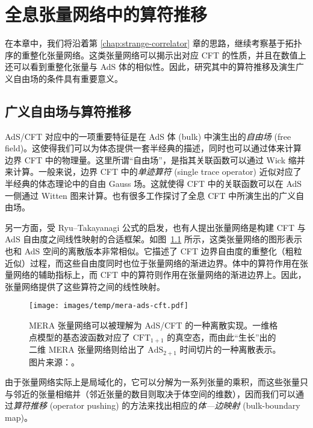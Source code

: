 \chapter{全息张量网络中的算符推移}
\label{chap:operator-pushing}

在本章中，我们将沿着第 \ref{chap:strange-correlator} 章的思路，继续考察基于拓扑序的重整化张量网络。这类张量网络可以揭示出对应 CFT 的性质，并且在数值上还可以看到重整化张量与 AdS 体的相似性。因此，研究其中的算符推移及演生广义自由场的条件具有重要意义。

\section{广义自由场与算符推移}

AdS/CFT 对应\cite{maldacena1999large}中的一项重要特征是在 AdS 体 (bulk) 中演生出的\emph{自由场} (free field)。这使得我们可以为体态提供一套半经典的描述，同时也可以通过体来计算边界 CFT 中的物理量。这里所谓“自由场”，是指其关联函数可以通过 Wick 缩并来计算。一般来说，边界 CFT 中的\emph{单迹算符} (single trace operator) 近似对应了半经典的体态理论中的自由 Gauss 场。这就使得 CFT 中的关联函数可以在 AdS 一侧通过 Witten 图来计算\cite{witten1998anti,gubser1998gauge}。也有很多工作探讨了全息 CFT 中所演生出的广义自由场\cite{dutsch2003generalized,liu2019dimensional,collier2019quantum,nebabu2023bulk}。

另一方面，受 Ryu--Takayanagi 公式\cite{ryu2006holographic}的启发，也有人提出张量网络是构建 CFT 与 AdS 自由度之间线性映射的合适框架\cite{swingle2012entanglement}。如图~\ref{fig:mera-ads-cft} 所示，这类张量网络的图形表示也和 AdS 空间的离散版本非常相似。它描述了 CFT 边界自由度的重整化（粗粒近似）过程，而这些自由度同时也位于张量网络的渐进边界。体中的算符作用在张量网络的辅助指标上，而 CFT 中的算符则作用在张量网络的渐进边界上。因此，张量网络提供了这些算符之间的线性映射\cite{pastawski2015holographic,hayden2016holographic}。

\begin{figure}[htb]
  \centering
  \texttt{[image: images/temp/mera-ads-cft.pdf]}
  \caption[MERA 张量网络与 AdS/CFT]{MERA 张量网络可以被理解为 AdS/CFT 的一种离散实现。一维格点模型的基态波函数对应了 $\text{CFT}_{1+1}$ 的真空态，而由此“生长”出的二维 MERA 张量网络则给出了 $\text{AdS}_{2+1}$ 时间切片的一种离散表示。图片来源：\parencite{evenbly2011tensor}。}
  \label{fig:mera-ads-cft}
\end{figure}

由于张量网络实际上是局域化的，它可以分解为一系列张量的乘积，而这些张量只与邻近的张量相缩并（邻近张量的数目则取决于体空间的维数），因而我们可以通过\emph{算符推移} (operator pushing) 的方法来找出相应的\emph{体—边映射} (bulk-boundary map)\cite{pastawski2015holographic,bhattacharyya2016exploring,bhattacharyya2018tensor}。

